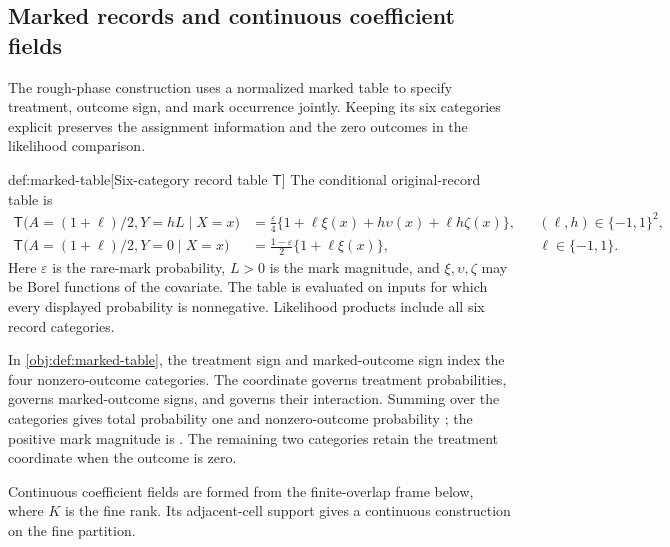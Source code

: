 \subsection{Marked records and continuous coefficient fields}

The rough-phase construction uses a normalized marked table  to specify treatment, outcome sign, and mark occurrence jointly. Keeping its six categories explicit preserves the assignment information and the zero outcomes in the likelihood comparison.

\begin{definitionv}{def:marked-table}[Six-category record table \(\mathsf T\)]
The conditional original-record table is
\[
\begin{aligned}
\mathsf T\bigl(A=(1+\ell)/2,Y=hL\mid X=x\bigr)
&=\frac{\varepsilon}{4}
\{1+\ell\xi(x)+h\upsilon(x)+\ell h\zeta(x)\},
&&(\ell,h)\in\{-1,1\}^2,\\
\mathsf T\bigl(A=(1+\ell)/2,Y=0\mid X=x\bigr)
&=\frac{1-\varepsilon}{2}\{1+\ell\xi(x)\},
&&\ell\in\{-1,1\}.
\end{aligned}
\]
Here \(\varepsilon\) is the rare-mark probability, \(L>0\) is the mark magnitude, and \(\xi,\upsilon,\zeta\) may be Borel functions of the covariate. The table is evaluated on inputs for which every displayed probability is nonnegative. Likelihood products include all six record categories.
\end{definitionv}

In \cref{obj:def:marked-table}, the treatment sign  and marked-outcome sign  index the four nonzero-outcome categories. The coordinate  governs treatment probabilities,  governs marked-outcome signs, and  governs their interaction. Summing over the categories gives total probability one and nonzero-outcome probability ; the positive mark magnitude is . The remaining two categories retain the treatment coordinate when the outcome is zero.

Continuous coefficient fields are formed from the finite-overlap frame  below, where \(K\) is the fine rank. Its adjacent-cell support gives a continuous construction on the fine partition.

